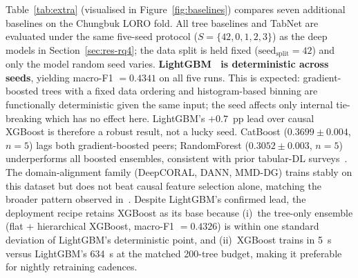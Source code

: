 \documentclass[3p,times,authoryear]{elsarticle}
\theoremstyle{remark}
\begin{document}
Table~\ref{tab:extra} (visualised in
Figure~\ref{fig:baselines}) compares seven additional baselines
on the Chungbuk LORO fold. All tree baselines and TabNet are
evaluated under the same five-seed protocol
($S = \{42, 0, 1, 2, 3\}$) as the deep models in
Section~\ref{sec:res-rq4}; the data split is held fixed
($\mathrm{seed}_{\mathrm{split}} = 42$) and only the model
random seed varies.
\textbf{LightGBM~\cite{ke2017lightgbm} is deterministic across
seeds}, yielding macro-F1 $= 0.4341$ on all five runs.
This is expected: gradient-boosted trees with a fixed data
ordering and histogram-based binning are functionally
deterministic given the same input; the seed affects only
internal tie-breaking which has no effect here. LightGBM's
$+0.7$~pp lead over causal XGBoost is therefore a robust result,
not a lucky seed.
CatBoost ($0.3699 \pm 0.004$, $n{=}5$) lags both gradient-boosted
peers; RandomForest ($0.3052 \pm 0.003$, $n{=}5$) underperforms
all boosted ensembles, consistent with prior tabular-DL
surveys~\cite{borisov2024tabsurvey}. The
domain-alignment family (DeepCORAL, DANN, MMD-DG) trains
stably on this dataset but does not beat causal feature
selection alone, matching the broader pattern observed
in~\cite{gulrajani2021dg}. Despite LightGBM's confirmed
lead, the deployment recipe retains XGBoost as its base
because (i)~the tree-only ensemble (flat + hierarchical
XGBoost, macro-F1 $= 0.4326$) is within one standard deviation
of LightGBM's deterministic point, and (ii)~XGBoost
trains in 5~s versus LightGBM's 634~s at the matched
200-tree budget, making it preferable for nightly retraining
cadences.

\begin{table}[!htbp]
\caption{Additional tabular and domain-alignment baselines on
the Chungbuk LORO fold. Tree and TabNet models report five-seed
mean~$\pm$~std (``det.'' = deterministic across seeds);
domain-alignment models are single-seed ($\dagger$).
Tree/tabular models use the 57 causal features;
domain-alignment models use the same MLP backbone with
$\lambda{=}1$ ($\alpha_{\max}{=}1$, $\lambda{=}0.5$ for
DANN).\label{tab:extra}}
\centering
\scriptsize
\setlength{\tabcolsep}{2pt}
\end{table}
\end{document}
